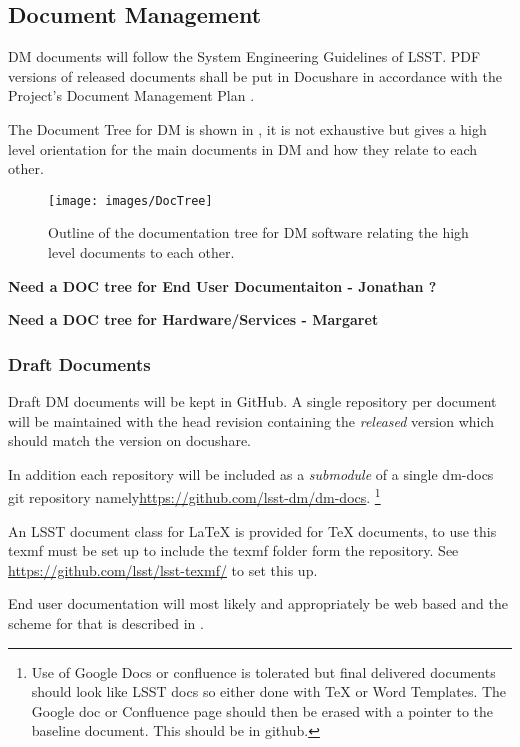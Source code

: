 \subsection {Document Management} \label{sect:docman}

DM documents will follow the System Engineering Guidelines of LSST. PDF versions of released documents shall be put in Docushare in accordance with the Project's Document Management Plan .

The Document Tree for DM is shown in , it is not exhaustive but gives a high level orientation for the main documents in DM and how they relate to each other.

\begin{figure}
\begin{center}
 \texttt{[image: images/DocTree]}
\caption{Outline of the documentation tree for DM software relating the high level documents to each other. \label{fig:doctree}}
\end{center}
\end{figure}


{\bf Need a DOC tree for End User Documentaiton - Jonathan ?}

{\bf Need a DOC tree for Hardware/Services  - Margaret }

\subsubsection{Draft Documents}
Draft DM documents will be kept in GitHub. A single repository per document will be maintained with the head revision containing the {\em released } version which should match the version on docushare. 

In addition each repository will be included as a {\em submodule} of a single dm-docs git repository namely\url{https://github.com/lsst-dm/dm-docs}. 
\footnote{Use of Google Docs or confluence is tolerated but final delivered documents should look like LSST docs so either done with TeX or Word Templates. The Google doc or Confluence page should then be erased with a pointer to the baseline document. This should be in github.}

An LSST document class for LaTeX is provided for TeX documents, to use this texmf must be set up to include the texmf folder form the repository. See \url{https://github.com/lsst/lsst-texmf/} to set this up. 

End user documentation will most likely and appropriately be web based and the scheme for that is described in \citeyearpar{LDM-493}.


